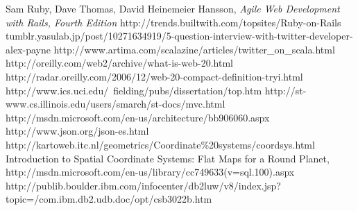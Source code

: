 \begin{thebibliography}{99}
   Sam Ruby, Dave Thomas, David Heinemeier Hansson, \emph{Agile Web Development with Rails, Fourth Edition}
    http://trends.builtwith.com/topsites/Ruby-on-Rails
   tumblr.yasulab.jp/post/10271634919/5-question-interview-with-twitter-developer-alex-payne
   http://www.artima.com/scalazine/articles/twitter\_on\_scala.html
   http://oreilly.com/web2/archive/what-is-web-20.html
   http://radar.oreilly.com/2006/12/web-20-compact-definition-tryi.html
   http://www.ics.uci.edu/~fielding/pubs/dissertation/top.htm
   http://st-www.cs.illinois.edu/users/smarch/st-docs/mvc.html
   http://msdn.microsoft.com/en-us/architecture/bb906060.aspx
   http://www.json.org/json-es.html
   http://kartoweb.itc.nl/geometrics/Coordinate\%20systems/coordsys.html
   Introduction to Spatial Coordinate Systems: Flat Maps for a Round Planet, http://msdn.microsoft.com/en-us/library/cc749633(v=sql.100).aspx
   http://publib.boulder.ibm.com/infocenter/db2luw/v8/index.jsp?topic=/com.ibm.db2.udb.doc/opt/csb3022b.htm

\end{thebibliography}
